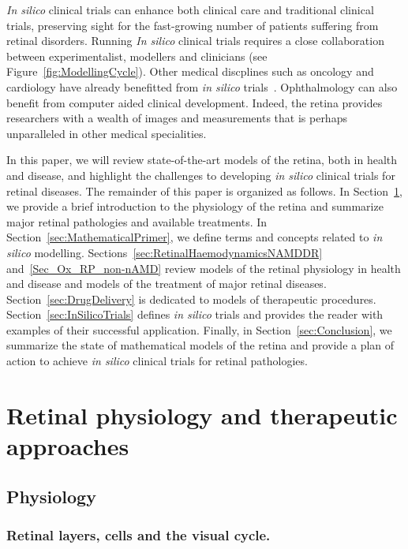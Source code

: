 \documentclass{article}
\begin{document}
\textit{In silico} clinical trials can enhance both clinical care and traditional clinical trials, preserving sight for the fast-growing number of patients suffering from retinal disorders.
Running \textit{In silico} clinical trials requires a close collaboration between experimentalist, modellers and clinicians (see Figure~\ref{fig:ModellingCycle}).
Other medical discplines such as oncology and cardiology have already benefitted from \textit{in silico} trials~\cite{Gaffney2022,Ravvaz2017}.
Ophthalmology can also benefit from computer aided clinical development.
Indeed, the retina provides researchers with a wealth of images and measurements that is perhaps unparalleled in other medical specialities.

In this paper, we will review state-of-the-art models of the retina, both in health and disease, and highlight the challenges to developing \textit{in silico} clinical trials for retinal diseases.
The remainder of this paper is organized as follows.
In Section~\ref{sec:RetinalPhysiology}, we provide a brief introduction to the physiology of the retina and summarize major retinal pathologies and available treatments.
In Section~\ref{sec:MathematicalPrimer}, we define terms and concepts related to \textit{in silico} modelling.
Sections~\ref{sec:RetinalHaemodynamicsNAMDDR} and~\ref{Sec_Ox_RP_non-nAMD} review models of the retinal physiology in health and disease and models of the treatment of major retinal diseases.
Section~\ref{sec:DrugDelivery} is dedicated to models of therapeutic procedures.
Section~\ref{sec:InSilicoTrials} defines \textit{in silico} trials and provides the reader with examples of their successful application.
Finally, in Section~\ref{sec:Conclusion}, we summarize the state of mathematical models of the retina and provide a plan of action to achieve \textit{in silico} clinical trials for retinal pathologies.

\section{Retinal physiology and therapeutic approaches}\label{sec:RetinalPhysiology}

\subsection{Physiology}


\subsubsection{Retinal layers, cells and the visual cycle.}
\end{document}

